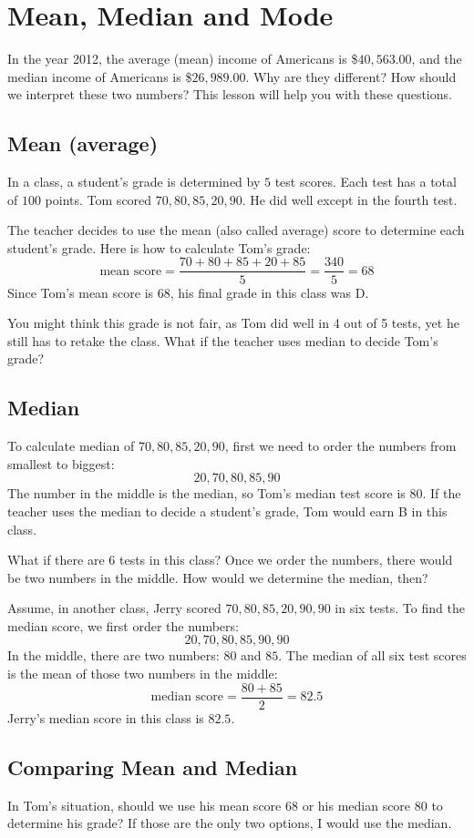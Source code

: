 
\section{Mean, Median and Mode}

In the year 2012, the average (mean) income of Americans is \$$40,563.00$, and the median income of Americans is \$$26,989.00$. Why are they different? How should we interpret these two numbers? This lesson will help you with these questions.

\subsection{Mean (average)}
In a class, a student's grade is determined by $5$ test scores. Each test has a total of $100$ points. Tom scored $70,80,85,20,90$. He did well except in the fourth test.

The teacher decides to use the mean (also called average) score to determine each student's grade. Here is how to calculate Tom's grade:
\[ \text{mean score}=\frac{70+80+85+20+85}{5}=\frac{340}{5}=68 \]
Since Tom's mean score is $68$, his final grade in this class was D.

You might think this grade is not fair, as Tom did well in 4 out of 5 tests, yet he still has to retake the class. What if the teacher uses median to decide Tom's grade?

\subsection{Median}
To calculate median of $70,80,85,20,90$, first we need to order the numbers from smallest to biggest:
\[ 20,70,80,85,90 \]
The number in the middle is the median, so Tom's median test score is $80$. If the teacher uses the median to decide a student's grade, Tom would earn B in this class.

What if there are $6$ tests in this class? Once we order the numbers, there would be two numbers in the middle. How would we determine the median, then?

Assume, in another class, Jerry scored $70,80,85,20,90,90$ in six tests. To find the median score, we first order the numbers:
\[ 20,70,80,85,90,90 \]
In the middle, there are two numbers: $80$ and $85$. The median of all six test scores is the mean of those two numbers in the middle:
\[ \text{median score}=\frac{80+85}{2}=82.5 \]
Jerry's median score in this class is $82.5$.

\subsection{Comparing Mean and Median}
In Tom's situation, should we use his mean score $68$ or his median score $80$ to determine his grade? If those are the only two options, I would use the median.

